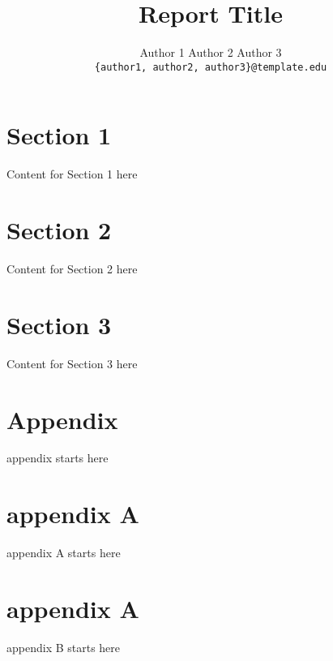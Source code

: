 \documentclass[12pt]{article}
\title{\textbf{Report Title}}
\author{Author 1 \quad Author 2 \quad  Author 3 \\\tt{\{author1, author2, author3\}@template.edu}}
\date{}
\begin{document}
\maketitle

\section{Section 1}
Content for Section 1 here
\section{Section 2}
Content for Section 2 here
\section{Section 3}
Content for Section 3 here

\section*{Appendix}

\appendix
appendix starts here 

\section{appendix A}

appendix A starts here 

\section{appendix A}

appendix B starts here 
\end{document}
